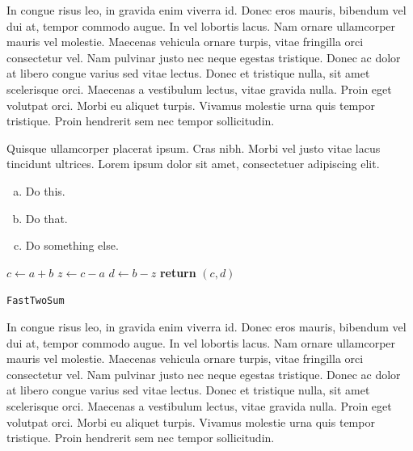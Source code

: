 \documentclass{article}
\begin{document}
\begin{warn}[Notice:]
  In congue risus leo, in gravida enim viverra id. Donec eros mauris, bibendum vel dui at, tempor commodo augue. In vel lobortis lacus. Nam ornare ullamcorper mauris vel molestie. Maecenas vehicula ornare turpis, vitae fringilla orci consectetur vel. Nam pulvinar justo nec neque egestas tristique. Donec ac dolor at libero congue varius sed vitae lectus. Donec et tristique nulla, sit amet scelerisque orci. Maecenas a vestibulum lectus, vitae gravida nulla. Proin eget volutpat orci. Morbi eu aliquet turpis. Vivamus molestie urna quis tempor tristique. Proin hendrerit sem nec tempor sollicitudin.
\end{warn}

\begin{question}
	Quisque ullamcorper placerat ipsum. Cras nibh. Morbi vel justo vitae lacus tincidunt ultrices. Lorem ipsum dolor sit amet, consectetuer adipiscing elit.

	\begin{enumerate}[(a)]
		\item Do this.
		\item Do that.
		\item Do something else.
	\end{enumerate}
\end{question}

\begin{center}
	\begin{minipage}{0.5\linewidth} %
		\begin{algorithm}[H]
			\medskip
			$c \leftarrow a + b$ \;
			$z \leftarrow c - a$ \;
			$d \leftarrow b - z$ \;
			{\bf return} $(c,d)$ \;
			\caption{\texttt{FastTwoSum}} %
			\label{alg:fastTwoSum}   %
		\end{algorithm}
	\end{minipage}
\end{center}

\begin{question}
	In congue risus leo, in gravida enim viverra id. Donec eros mauris, bibendum vel dui at, tempor commodo augue. In vel lobortis lacus. Nam ornare ullamcorper mauris vel molestie. Maecenas vehicula ornare turpis, vitae fringilla orci consectetur vel. Nam pulvinar justo nec neque egestas tristique. Donec ac dolor at libero congue varius sed vitae lectus. Donec et tristique nulla, sit amet scelerisque orci. Maecenas a vestibulum lectus, vitae gravida nulla. Proin eget volutpat orci. Morbi eu aliquet turpis. Vivamus molestie urna quis tempor tristique. Proin hendrerit sem nec tempor sollicitudin.
\end{question}

\end{document}
